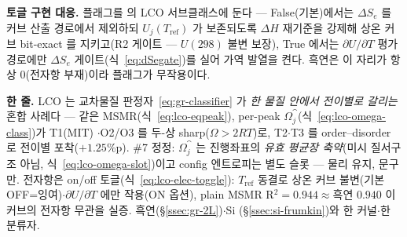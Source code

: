 \begin{codebox}
\textbf{토글 구현 대응.}  플래그를 
의 LCO 서브클래스에 둔다 --- False(기본)에서는 $\Delta S_e$ 를 커브 산출 경로에서 제외하되 $U_j(T_\mathrm{ref})$
가 보존되도록 $\Delta H$ 재기준을 강제해 상온 커브 bit-exact 를 지키고(R2 게이트 --- $U(298)$ 불변 보장),
True 에서는 $\partial U/\partial T$ 평가 경로에만 $\Delta S_e$ 게이트(식~\eqref{eq:dSegate})를 실어 가역
발열을 켠다. 흑연은 이 자리가 항상 $0$(전자항 부재)이라 플래그가 무작용이다.
\end{codebox}

\begin{keybox}
\textbf{한 줄.} LCO 는 교차물질 판정자~\eqref{eq:gr-classifier} 가 \emph{한 물질 안에서 전이별로 갈리는} 혼합
사례다 --- 같은 MSMR(식~\eqref{eq:lco-eqpeak}), per-peak $\Omega_j^\cat$(식~\eqref{eq:lco-omega-class})가 T1(MIT)
$\cdot$O2/O3 를 두-상 sharp($\Omega>2RT$)로, T2$\cdot$T3 를 order--disorder 로 전이별 포착($+1.25$\%p). \#7
정정: $\Omega_j^\cat$ 는 진행좌표의 \emph{유효 평균장 축약}(미시 질서구조 아님, 식~\eqref{eq:lco-omega-slot})이고
config 엔트로피는 별도 슬롯 --- 물리 유지, 문구만. 전자항은 on/off 토글(식~\eqref{eq:lco-elec-toggle}):
$T_\mathrm{ref}$ 동결로 상온 커브 불변(기본 OFF=잉여)$\cdot$$\partial U/\partial T$ 에만 작용(ON 옵션), plain MSMR
R$^2{=}0.944\!\approx\!$흑연 $0.940$ 이 커브의 전자항 무관을 실증. 흑연(\S\ref{ssec:gr-2L})$\cdot$Si
(\S\ref{ssec:si-frumkin})와 한 커널$\cdot$한 분류자.
\end{keybox}

